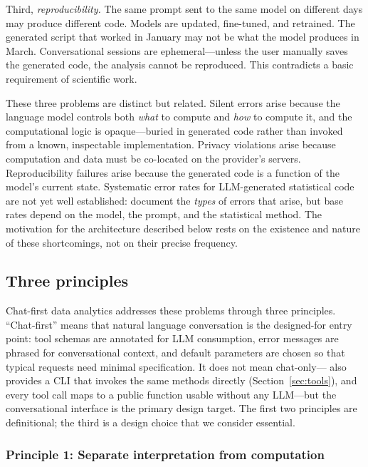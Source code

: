Third, \emph{reproducibility.} The same prompt sent to the same model
on different days may produce different code. Models are updated,
fine-tuned, and retrained. The generated  script that
worked in January may not be what the model produces in March.
Conversational sessions are ephemeral---unless the user manually saves
the generated code, the analysis cannot be reproduced. This
contradicts a basic requirement of scientific work.

These three problems are distinct but related. Silent errors arise
because the language model controls both \emph{what} to compute and
\emph{how} to compute it, and the computational logic is
opaque---buried in generated code rather than invoked from a known,
inspectable implementation. Privacy violations arise because
computation and data must be co-located on the provider's servers.
Reproducibility failures arise because the generated code is a
function of the model's current state.
Systematic error rates for LLM-generated statistical code are not
yet well established: \citet{Ludwig+Mullainathan+Rambachan:2025}
document the \emph{types} of errors that arise, but base rates
depend on the model, the prompt, and the statistical method. The
motivation for the architecture described below rests on the
existence and nature of these shortcomings, not on their precise
frequency.

\subsection{Three principles} \label{sec:principles}

Chat-first data analytics addresses these problems through three
principles. ``Chat-first'' means that natural language conversation
is the designed-for entry point: tool schemas are annotated for LLM
consumption, error messages are phrased for conversational context,
and default parameters are chosen so that typical requests need
minimal specification. It does not mean chat-only---
also provides a CLI that invokes the same methods directly
(Section~\ref{sec:tools}), and every tool call maps to a public
 function usable without any LLM---but the
conversational interface is the primary design target. The first
two principles are definitional; the third is a design choice that we
consider essential.

\subsubsection{Principle 1: Separate interpretation from computation}

